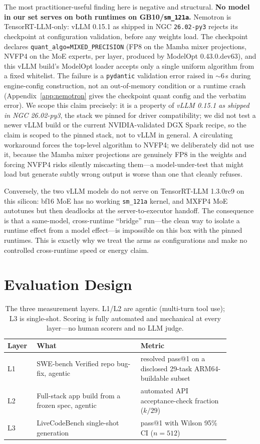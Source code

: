 \documentclass[10pt,twocolumn]{article}
\newcommand{\code}[1]{\texttt{\small #1}}
\begin{document}
The most practitioner-useful finding here is negative and structural. \textbf{No model in
our set serves on both runtimes on GB10/\code{sm\_121a}.} Nemotron is TensorRT-LLM-only:
vLLM 0.15.1 as shipped in NGC \code{26.02-py3} rejects its checkpoint at configuration
validation, before any weights load. The checkpoint declares
\code{quant\_algo=MIXED\_PRECISION} (FP8 on the Mamba mixer projections, NVFP4 on the MoE
experts, per layer, produced by ModelOpt 0.43.0.dev63), and this vLLM build's ModelOpt loader
accepts only a single uniform algorithm from a fixed whitelist. The failure is a
\code{pydantic} validation error raised in ${\sim}6$\,s during engine-config
construction, not an out-of-memory condition or a runtime crash
(Appendix~\ref{app:nemotron} gives the checkpoint quant config and the verbatim error). We scope this claim
precisely: it is a property of \emph{vLLM 0.15.1 as shipped in NGC 26.02-py3}, the stack we
pinned for driver compatibility; we did not test a newer vLLM build or the current
NVIDIA-validated DGX Spark recipe, so the claim is scoped to the pinned stack, not to vLLM in
general. A circulating workaround forces the top-level algorithm to NVFP4; we deliberately did
not use it, because the Mamba mixer projections are genuinely FP8 in the weights and forcing
NVFP4 risks silently miscasting them---a model-under-test that might load but generate subtly
wrong output is worse than one that cleanly refuses.

Conversely, the two vLLM models do not serve on TensorRT-LLM 1.3.0rc9 on this silicon: bf16
MoE has no working \code{sm\_121a} kernel, and MXFP4 MoE autotunes but then deadlocks at the
server-to-executor handoff. The consequence is that a same-model, cross-runtime ``bridge''
run---the clean way to isolate a runtime effect from a model effect---is impossible on this
box with the pinned runtimes. This is exactly why we treat the arms as configurations and
make no controlled cross-runtime speed or energy claim.

\section{Evaluation Design}

\begin{table}[t]
\centering
\caption{The three measurement layers. L1/L2 are agentic (multi-turn tool use); L3 is
single-shot. Scoring is fully automated and mechanical at every layer---no human scorers and
no LLM judge.}
\label{tab:layers}
\small
\setlength{\tabcolsep}{3pt}
\begin{tabular}{@{}p{0.10\linewidth}p{0.42\linewidth}p{0.36\linewidth}@{}}
\toprule
Layer & What & Metric \\
\midrule
L1 & SWE-bench Verified repo bug-fix, agentic & resolved pass@1 on a disclosed 29-task
ARM64-buildable subset \\
L2 & Full-stack app build from a frozen spec, agentic & automated API acceptance-check
fraction ($k/29$) \\
L3 & LiveCodeBench single-shot generation & pass@1 with Wilson 95\% CI ($n{=}512$) \\
\bottomrule
\end{tabular}
\end{table}
\end{document}
